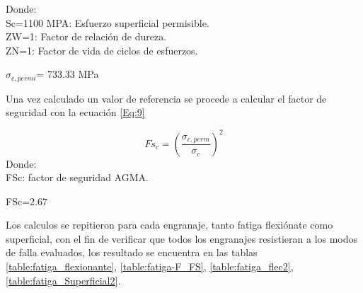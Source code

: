 Donde:\\ 
Sc=1100 MPA: Esfuerzo superficial permisible.\\
ZW=1: Factor de relación de dureza.\\
ZN=1: Factor de vida de ciclos de esfuerzos.\\

\begin{center}
    $\sigma_{c, permi}$= 733.33 MPa
\end{center}

Una vez calculado un valor de referencia se procede a calcular el factor de seguridad con la ecuación \ref{Eq:9}

\begin{equation}
    Fs_{c}=(\frac{\sigma_{c,perm}}{\sigma_{c}})^{2}
    \label{Eq:9}
\end{equation}
Donde:\\
FSc: factor de seguridad AGMA.
\begin{center}
    FSc=2.67
\end{center}


Los calculos se repitieron para cada engranaje, tanto fatiga flexiónate como superficial, con el fin de verificar que todos los engranajes resistieran a los modos de falla evaluados, los resultado se encuentra en las tablas \ref{table:fatiga_flexionante}, \ref{table:fatiga-F_FS}, \ref{table:fatiga_flec2}, \ref{table:fatiga_Superficial2}.










